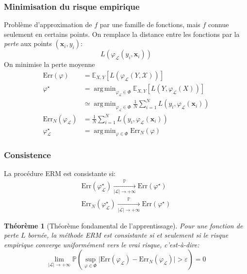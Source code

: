 \documentclass[dvipsnames,10pt]{beamer}
\DeclareMathOperator*{\argmin}{arg\,min}
\theoremstyle{plain}
\newtheorem{theoreme}{Théorème}
\theoremstyle{definition}
\begin{document}
\begin{frame}
\frametitle{Minimisation du risque empirique}
Problème d'approximation de $f$ par une famille de fonctions, mais $f$ connue seulement en certains points. On remplace la distance entre les fonctions par la \emph{perte} aux points $(\mathbf{x}_i,y_i)$:
\begin{equation*}
    L(\varphi_{\mathcal{L}} (y_i,\mathbf{x}_i))
\end{equation*}
On minimise la perte moyenne
\begin{align*}
    \mathrm{Err} \left( \varphi  \right) &= \mathbb{E}_{X,Y} \left[ L(\varphi_{\mathcal{L}} (Y,\mathcal{X})) \right] \\
    \varphi^\star &= \argmin_{\varphi_{\mathcal{L}} \in \Phi} \mathbb{E}_{X,Y} \left[ L\left(Y,\varphi_{\mathcal{L}}\left(X\right)\right) \right] \\
    &\simeq \argmin_{\varphi_{\mathcal{L}} \in \Phi} \frac{1}{N} \sum_{i=1}^N L\left(y_i,\varphi_{\mathcal{L}}\left(\mathbf{x}_i\right)\right) \\
    \mathrm{Err}_N \left( \varphi_{\mathcal{L}} \right) &= \frac{1}{N} \sum_{i=1}^N L\left(y_i,\varphi_{\mathcal{L}}\left(\mathbf{x}_i\right)\right) \\
    \varphi_{\mathcal{L}}^\star &= \argmin_{\varphi \in \Phi} \mathrm{Err}_N \left( \varphi  \right)
\end{align*}
\end{frame}

\begin{frame}
\frametitle{Consistence}
\begin{definition}
    La procédure ERM est consistante si:
    \begin{align*}
        \mathrm{Err} \left( \varphi_{\mathcal{L}}^\star \right) \xrightarrow[\vert \mathcal{L} \vert \to +\infty]{\mathbb{P}} \mathrm{Err} ( \varphi^\star ) \\
        \mathrm{Err}_N \left( \varphi_{\mathcal{L}}^\star \right) \xrightarrow[\vert \mathcal{L} \vert \to +\infty]{\mathbb{P}} \mathrm{Err} ( \varphi^\star )
    \end{align*}
\end{definition}
\begin{theoreme}[Théorème fondamental de l'apprentissage]
    Pour une fonction de perte $L$ bornée, la méthode ERM est consistante si et seulement si le risque empirique converge uniformément vers le vrai risque, c'est-à-dire:
    \begin{equation}
        \lim_{\vert \mathcal{L} \vert \to +\infty} \mathbb{P} \left( \sup_{\varphi \in \Phi} \vert \mathrm{Err} ( \varphi_{\mathcal{L}} ) - \mathrm{Err}_N ( \varphi_{\mathcal{L}} ) \vert > \varepsilon \right) = 0 \label{equ:vc.consistant}
    \end{equation}
\end{theoreme}
\end{frame}
\end{document}
